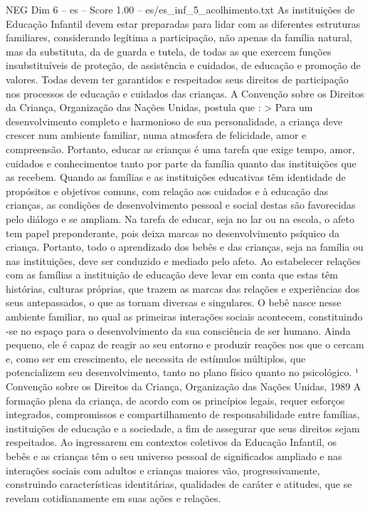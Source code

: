 \begin{textsample}{NEG Dim 6 – es – Score 1.00 – es/es\_inf\_5\_acolhimento.txt}
As instituições de Educação Infantil devem estar preparadas para lidar com as diferentes estruturas familiares, considerando legítima a participação, não apenas da família natural, mas da substituta, da de guarda e tutela, de todas as que exercem funções insubstituíveis de proteção, de assistência e cuidados, de educação e promoção de valores.
Todas devem ter garantidos e respeitados seus direitos de participação nos processos de educação e cuidados das crianças.
A Convenção sobre os Direitos da Criança, Organização das Nações Unidas, postula que : > Para um desenvolvimento completo e harmonioso de sua personalidade, a criança deve crescer num ambiente familiar, numa atmosfera de felicidade, amor e compreensão.
Portanto, educar as crianças é uma tarefa que exige tempo, amor, cuidados e conhecimentos tanto por parte da família quanto das instituições que as recebem.
Quando as famílias e as instituições educativas têm identidade de propósitos e objetivos comuns, com relação aos cuidados e à educação das crianças, as condições de desenvolvimento pessoal e social destas são favorecidas pelo diálogo e se ampliam.
Na tarefa de educar, seja no lar ou na escola, o afeto tem papel preponderante, pois deixa marcas no desenvolvimento psíquico da criança.
Portanto, todo o aprendizado dos bebês e das crianças, seja na família ou nas instituições, deve ser conduzido e mediado pelo afeto.
Ao estabelecer relações com as famílias a instituição de educação deve levar em conta que estas têm histórias, culturas próprias, que trazem as marcas das relações e experiências dos seus antepassados, o que as tornam diversas e singulares.
O bebê nasce nesse ambiente familiar, no qual as primeiras interações sociais acontecem, constituindo -se no espaço para o desenvolvimento da sua consciência de ser humano.
Ainda pequeno, ele é capaz de reagir ao seu entorno e produzir reações nos que o cercam e, como ser em crescimento, ele necessita de estímulos múltiplos, que potencializem seu desenvolvimento, tanto no plano físico quanto no psicológico. ¹ Convenção sobre os Direitos da Criança, Organização das Nações Unidas, 1989 A formação plena da criança, de acordo com os princípios legais, requer esforços integrados, compromissos e compartilhamento de responsabilidade entre famílias, instituições de educação e a sociedade, a fim de assegurar que seus direitos sejam respeitados.
Ao ingressarem em contextos coletivos da Educação Infantil, os bebês e as crianças têm o seu universo pessoal de significados ampliado e nas interações sociais com adultos e crianças maiores vão, progressivamente, construindo características identitárias, qualidades de caráter e atitudes, que se revelam cotidianamente em suas ações e relações.

\end{textsample}
